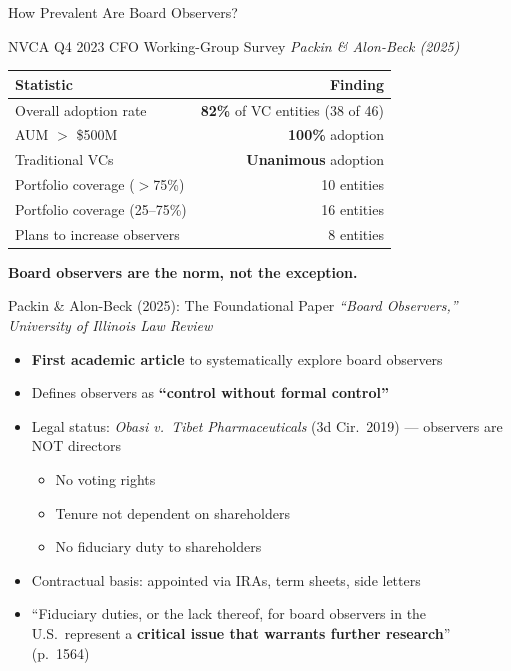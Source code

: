 \documentclass[aspectratio=169,12pt]{beamer}
\begin{document}
\begin{frame}{How Prevalent Are Board Observers?}
\begin{block}{NVCA Q4 2023 CFO Working-Group Survey \hfill\small\textit{Packin \& Alon-Beck (2025)}}
\centering
\vspace{0.3em}
\footnotesize
\begin{tabular}{@{}l r@{}}
\toprule
\textbf{Statistic} & \textbf{Finding} \\
\midrule
Overall adoption rate & \textbf{82\%} of VC entities (38 of 46) \\
AUM $>$ \$500M & \textbf{100\%} adoption \\
Traditional VCs & \textbf{Unanimous} adoption \\
Portfolio coverage ($>$75\%) & 10 entities \\
Portfolio coverage (25--75\%) & 16 entities \\
Plans to increase observers & 8 entities \\
\bottomrule
\end{tabular}
\end{block}
\vspace{0.5em}
\begin{center}
\large\textbf{Board observers are the norm, not the exception.}
\end{center}
\end{frame}

\begin{frame}{Packin \& Alon-Beck (2025): The Foundational Paper}
\textit{``Board Observers,'' University of Illinois Law Review}
\vspace{0.3em}
\begin{itemize}
\item \textbf{First academic article} to systematically explore board observers
\item Defines observers as \textbf{``control without formal control''}
\item Legal status: \textit{Obasi v.\ Tibet Pharmaceuticals} (3d Cir.\ 2019) --- observers are NOT directors
\begin{itemize}
    \footnotesize
    \item No voting rights
    \item Tenure not dependent on shareholders
    \item No fiduciary duty to shareholders
\end{itemize}
\item Contractual basis: appointed via IRAs, term sheets, side letters
\item ``Fiduciary duties, or the lack thereof, for board observers in the U.S.\ represent a \textbf{critical issue that warrants further research}'' (p.\ 1564)
\end{itemize}
\end{frame}
\end{document}
